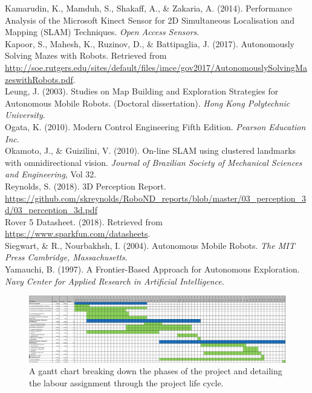 \documentclass[a4paper]{article}
\begin{document}
\normalsize
Kamarudin, K., Mamduh, S., Shakaff, A., \& Zakaria, A. (2014). Performance Analysis of the Microsoft Kinect Sensor for 2D Simultaneous Localisation and Mapping (SLAM) Techniques. \textit{Open Access Sensors}.\\

\normalsize
Kapoor, S., Mahesh, K., Ruzinov, D., \& Battipaglia, J. (2017). Autonomously Solving Mazes with Robots. Retrieved from \small\url{http://soe.rutgers.edu/sites/default/files/imce/gov2017/AutonomouslySolvingMazeswithRobots.pdf}.\\

\normalsize
Leung, J. (2003). Studies on Map Building and Exploration Strategies for Autonomous Mobile Robots. (Doctoral dissertation). \textit{Hong Kong Polytechnic University}.\\

\normalsize
Ogata, K. (2010). Modern Control Engineering Fifth Edition. \textit{Pearson Education Inc}.\\ 

\normalsize
Okamoto, J., \& Guizilini, V. (2010). On-line SLAM using clustered landmarks with omnidirectional vision. \textit{Journal of Brazilian Society of Mechanical Sciences and Engineering}, Vol 32.\\

\normalsize
Reynolds, S. (2018). 3D Perception Report. \url{https://github.com/skreynolds/RoboND_reports/blob/master/03_perception_3d/03_perception_3d.pdf}\\

\normalsize
Rover 5 Datasheet. (2018). Retrieved from \url{https://www.sparkfun.com/datasheets}.\\

\normalsize
Siegwart, \& R., Nourbakhsh, I. (2004). Autonomous Mobile Robots. \textit{The MIT Press Cambridge, Massachusetts}.\\

\normalsize
Yamauchi, B. (1997). A Frontier-Based Approach for Autonomous Exploration. \textit{Navy Center for Applied Research in Artificial Intelligence}.\\

\begin{figure}
\centering
\includegraphics[scale=0.38]{gantt_chart}
\caption{A gantt chart breaking down the phases of the project and detailing the labour assignment through the project life cycle.}
\end{figure}
\end{document}
